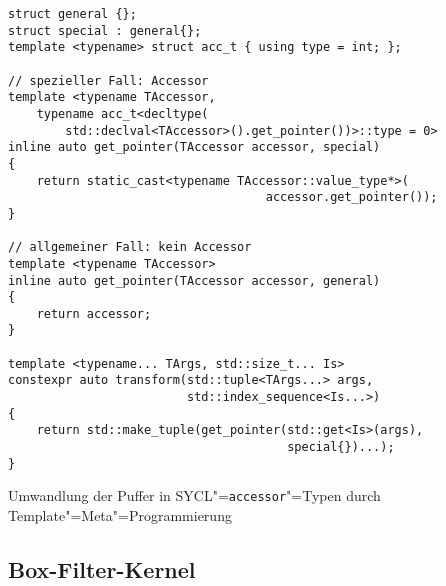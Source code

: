 \begin{code}
    \begin{verbatim}
struct general {};
struct special : general{};
template <typename> struct acc_t { using type = int; };

// spezieller Fall: Accessor
template <typename TAccessor,
    typename acc_t<decltype(
        std::declval<TAccessor>().get_pointer())>::type = 0>
inline auto get_pointer(TAccessor accessor, special)
{
    return static_cast<typename TAccessor::value_type*>(
                                    accessor.get_pointer());
}

// allgemeiner Fall: kein Accessor
template <typename TAccessor>
inline auto get_pointer(TAccessor accessor, general)
{
    return accessor;
}

template <typename... TArgs, std::size_t... Is>
constexpr auto transform(std::tuple<TArgs...> args,
                         std::index_sequence<Is...>)
{
    return std::make_tuple(get_pointer(std::get<Is>(args),
                                       special{})...);
}
    \end{verbatim}
    \caption{Umwandlung der Puffer in SYCL"=\texttt{accessor}"=Typen durch
             Template"=Meta"=Programmierung}
\end{code}

\subsection{Box-Filter-Kernel}
\label{anhang:source:cpp:boxkernel}

